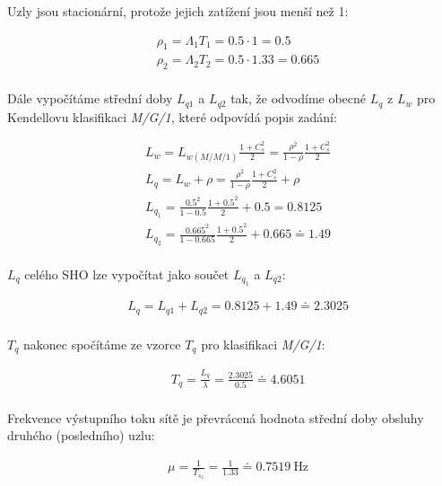 \documentclass[12pt, a4paper]{article}
\begin{document}
Uzly jsou stacionární, protože jejich zatížení jsou menší než 1:

\begin{equation}
    \begin{split}
    & \rho_1 = \Lambda_1T_1 = 0.5 \cdot 1 = 0.5 \\
    & \rho_2 = \Lambda_2T_2 = 0.5 \cdot 1.33 = 0.665 \\
    \end{split}
\end{equation}

Dále vypočítáme střední doby $L_{q1}$ a $L_{q2}$ tak, že odvodíme obecné $L_q$ z $L_w$ pro Kendellovu klasifikaci \textit{M/G/1}, které odpovídá popis zadání:


\begin{equation}
    \begin{split}
    & L_w = L_{w(M/M/1)} \frac{1+C_{s}^{2}}{2} = \frac{\rho^2}{1 - \rho} \frac{1+C_{s}^{2}}{2}\\
    & L_q = L_w + \rho =  \frac{\rho^2}{1 - \rho} \frac{1+C_{s}^{2}}{2}  + \rho \\
    & L_{q_1} = \frac{0.5^2}{1 - 0.5} \frac{1+0.5^{2}}{2} + 0.5 = 0.8125 \\
    & L_{q_2} = \frac{0.665^2}{1 - 0.665} \frac{1+0.5^{2}}{2} + 0.665 \doteq 1.49 \\
    \end{split}
\end{equation}

$L_q$ celého SHO lze vypočítat jako součet $L_{q_1}$ a $L_{q2}$:



\begin{equation}
    \begin{split}
    & L_q = L_{q1} + L_{q2} = 0.8125 + 1.49 \doteq 2.3025 \\
    \end{split}
\end{equation}

$T_q$ nakonec spočítáme ze vzorce $T_q$ pro klasifikaci \textit{M/G/1}:

\begin{equation}
    \begin{split}
    & T_q = \frac{L_q}{\lambda} = \frac{2.3025}{0.5} \doteq 4.6051 \\
    \end{split}
\end{equation}

Frekvence výstupního toku sítě je převrácená hodnota střední doby obsluhy druhého (posledního) uzlu:

\begin{equation}
    \begin{split}
    & \mu = \frac{1}{T_{s_2}} = \frac{1}{1.33} \doteq \SI[product-units = single]{0.7519}{\Hz} \\
    \end{split}
\end{equation}
\end{document}
